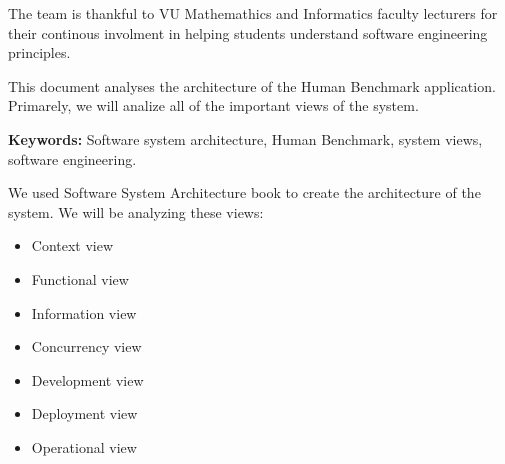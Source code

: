 \documentclass[]{VUMIFTemplateClass}
\begin{document}

\onehalfspacing



The team is thankful to VU Mathemathics and Informatics faculty lecturers for their continous involment in helping students understand software engineering principles.


This document analyses the architecture of the Human Benchmark application. Primarely, we will analize all of the important views of the system.

\textbf{Keywords:} Software system architecture, Human Benchmark, system views, software engineering.






\singlespacing
{}
\listoffigures

\listoftables

\tableofcontents
\onehalfspacing



We used Software System Architecture book to create the architecture of the system.
We will be analyzing these views:
\begin{itemize}
    \item Context view
    \item Functional view
    \item Information view
    \item Concurrency view
    \item Development view
    \item Deployment view
    \item Operational view
\end{itemize}










\end{document}
